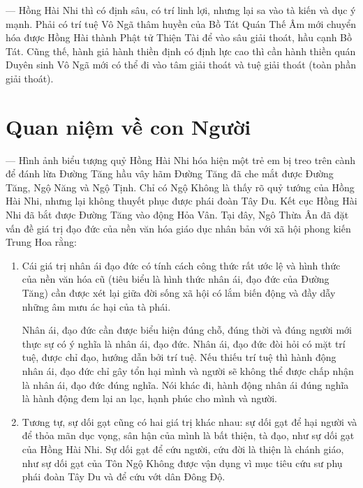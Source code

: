 — Hồng Hài Nhi thì có định sâu, có trí linh lợi, nhưng lại sa vào tà kiến và dục ý mạnh. Phải có trí tuệ Vô Ngã thâm huyền của Bồ Tát Quán Thế Âm mới chuyển hóa được Hồng Hài thành Phật tử Thiện Tài để vào sâu giải thoát, hầu cạnh Bồ Tát. Cũng thế, hành giả hành thiền định có định lực cao thì cần hành thiền quán Duyên sinh Vô Ngã mới có thể đi vào tâm giải thoát và tuệ giải thoát (toàn phần giải thoát).

\section{Quan niệm về con Người} %
\label{sec:40_41_con_nguoi}


— Hình ảnh biểu tượng quỷ Hồng Hài Nhi hóa hiện một trẻ em bị treo trên cành để đánh lừa Đường Tăng hầu vây hãm Đường Tăng đã che mắt được Đường Tăng, Ngộ Năng và Ngộ Tịnh. Chỉ có Ngộ Không là thấy rõ quỷ tướng của Hồng Hài Nhi, nhưng lại không thuyết phục được phái đoàn Tây Du. Kết cục Hồng Hài Nhi đã bắt được Đường Tăng vào động Hỏa Vân. Tại đây, Ngô Thừa Ân đã đặt vấn đề giá trị đạo đức của nền văn hóa giáo dục nhân bản với xã hội phong kiến Trung Hoa rằng:

\begin{enumerate}[label=\itshape\arabic*\upshape/]
   \item Cái giá trị nhân ái đạo đức có tính cách công thức rất ước lệ và hình thức của nền văn hóa cũ (tiêu biểu là hình thức nhân ái, đạo đức của Đường Tăng) cần được xét lại giữa đời sống xã hội có lắm biến động và đầy dẫy những âm mưu ác hại của tà phái.

   Nhân ái, đạo đức cần được biểu hiện đúng chỗ, đúng thời và đúng người mới thực sự có ý nghĩa là nhân ái, đạo đức. Nhân ái, đạo đức đòi hỏi có mặt trí tuệ, được chỉ đạo, hướng dẫn bởi trí tuệ. Nếu thiếu trí tuệ thì hành động nhân ái, đạo đức chỉ gây tổn hại mình và người sẽ không thể được chấp nhận là nhân ái, đạo đức đúng nghĩa. Nói khác đi, hành động nhân ái đúng nghĩa là hành động đem lại an lạc, hạnh phúc cho mình và người.

    \item Tương tự, sự dối gạt cũng có hai giá trị khác nhau: sự dối gạt để hại người và để thỏa mãn dục vọng, sân hận của mình là bất thiện, tà đạo, như sự dối gạt của Hồng Hài Nhi. Sự dối gạt để cứu người, cứu đời là thiện là chánh giáo, như sự dối gạt của Tôn Ngộ Không được vận dụng vì mục tiêu cứu sư phụ phái đoàn Tây Du và để cứu vớt dân Đông Độ.
\end{enumerate}

